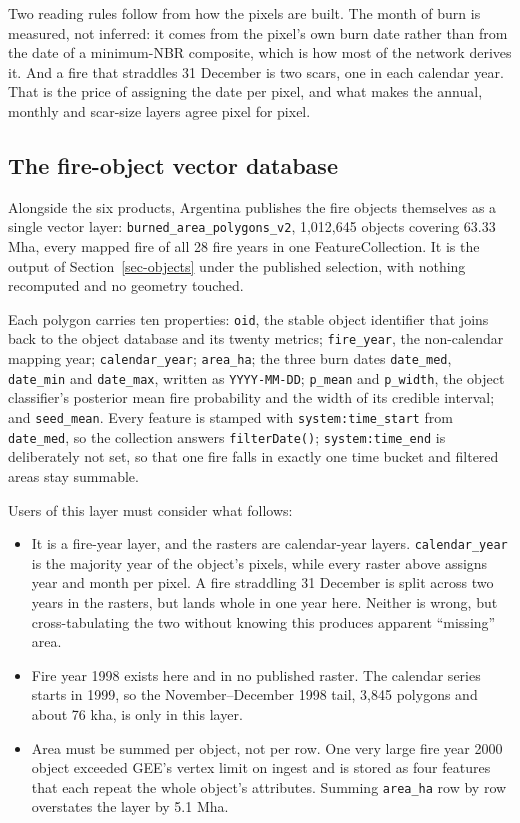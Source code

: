 \documentclass[11pt,a4paper]{article}
\begin{document}
Two reading rules follow from how the pixels are built. The month of burn is measured, not
inferred: it comes from the pixel's own burn date rather than from the date of a minimum-NBR
composite, which is how most of the network derives it. And a fire that straddles 31 December is
two scars, one in each calendar year. That is the price of assigning the date per pixel, and what
makes the annual, monthly and scar-size layers agree pixel for pixel.

\subsection{The fire-object vector database}\label{sec-polygons}

Alongside the six products, Argentina publishes the fire objects themselves as a
single vector layer: \texttt{burned\_area\_polygons\_v2}, 1,012,645 objects covering 63.33 Mha,
every mapped fire of all 28 fire years in one FeatureCollection. It is the output of
Section~\ref{sec-objects} under the published selection, with nothing recomputed and no geometry
touched.

Each polygon carries ten properties: \texttt{oid}, the stable object identifier that joins back to
the object database and its twenty metrics; \texttt{fire\_year}, the non-calendar mapping year;
\texttt{calendar\_year}; \texttt{area\_ha}; the three burn dates \texttt{date\_med},
\texttt{date\_min} and \texttt{date\_max}, written as \texttt{YYYY-MM-DD}; \texttt{p\_mean} and
\texttt{p\_width}, the object classifier's posterior mean fire probability and the width of its
credible interval; and \texttt{seed\_mean}. Every feature is stamped with
\texttt{system:time\_start} from \texttt{date\_med}, so the collection answers \texttt{filterDate()};
\texttt{system:time\_end} is deliberately not set, so that one fire falls in exactly one time bucket
and filtered areas stay summable.

Users of this layer must consider what follows:

\begin{itemize}
  \item It is a fire-year layer, and the rasters are calendar-year layers.
        \texttt{calendar\_year} is the majority year of the object's pixels, while every raster
        above assigns year and month per pixel. A fire straddling 31 December is split across two
        years in the rasters, but lands whole in one year here. Neither is wrong, but cross-tabulating
        the two without knowing this produces apparent \enquote{missing} area.
  \item Fire year 1998 exists here and in no published raster. The calendar series starts in
        1999, so the November--December 1998 tail, 3,845 polygons and about 76 kha, is only in this
        layer.
  \item Area must be summed per object, not per row. One very large fire year 2000 object
        exceeded GEE's vertex limit on ingest and is stored as four features that each repeat
        the whole object's attributes. Summing \texttt{area\_ha} row by row overstates the layer by
        5.1 Mha.
\end{itemize}
\end{document}
